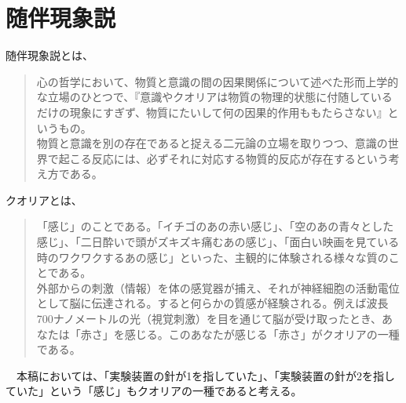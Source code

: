 \section{随伴現象説}
随伴現象説とは、
\begin{quotation}
心の哲学において、物質と意識の間の因果関係について述べた形而上学的な立場のひとつで、『意識やクオリアは物質の物理的状態に付随しているだけの現象にすぎず、物質にたいして何の因果的作用ももたらさない』というもの。\\物質と意識を別の存在であると捉える二元論の立場を取りつつ、意識の世界で起こる反応には、必ずそれに対応する物質的反応が存在するという考え方である。\cite{wikipedia}
\end{quotation}
クオリアとは、
\begin{quotation}
「感じ」のことである。「イチゴのあの赤い感じ」、「空のあの青々とした感じ」、「二日酔いで頭がズキズキ痛むあの感じ」、「面白い映画を見ている時のワクワクするあの感じ」といった、主観的に体験される様々な質のことである。\\
外部からの刺激（情報）を体の感覚器が捕え、それが神経細胞の活動電位として脳に伝達される。すると何らかの質感が経験される。例えば波長700ナノメートルの光（視覚刺激）を目を通じて脳が受け取ったとき、あなたは「赤さ」を感じる。このあなたが感じる「赤さ」がクオリアの一種である。\cite{wikipediaa}
\end{quotation}
　本稿においては、「実験装置の針が1を指していた」、「実験装置の針が2を指していた」という「感じ」もクオリアの一種であると考える。
